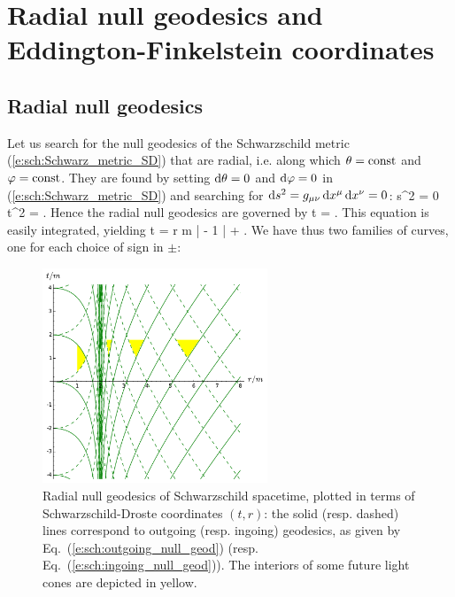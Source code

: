 
\section{Radial null geodesics and Eddington-Finkelstein coordinates}

\subsection{Radial null geodesics}

Let us search for the null geodesics of the Schwarzschild metric
(\ref{e:sch:Schwarz_metric_SD}) that are radial, i.e. along which
$\theta=\mathrm{const}$ and $\varphi=\mathrm{const}$. They are found by
setting  $\mathrm{d}\theta=0$ and $\mathrm{d}\varphi=0$
in (\ref{e:sch:Schwarz_metric_SD})
and searching for $\mathrm{d} s^2 = g_{\mu\nu}\, \mathrm{d} x^\mu \, \mathrm{d} x^\nu = 0$:
\be \label{e:sch:radial_null}
    \D s^2 = 0 \iff \D t^2 =  .
\ee
Hence the radial null geodesics are governed by
\be
    \D t = \pm {} .
\ee
This equation is easily integrated, yielding
\be
    t = \pm r  m \ln \left|  - 1 \right| +  .
\ee
We have thus two families of curves, one for each choice
of sign in $\pm$:

\begin{figure}
\centerline{\includegraphics[width=0.6\textwidth]{sch_rad_null_geod.pdf}}
\caption[]{\label{f:sch:rad_null_geod} \footnotesize
Radial null geodesics of Schwarzschild spacetime, plotted in terms
of Schwarzschild-Droste coordinates $(t,r)$: the solid (resp. dashed) lines
correspond to outgoing (resp. ingoing) geodesics, as given by Eq.~(\ref{e:sch:outgoing_null_geod})
(resp. Eq.~(\ref{e:sch:ingoing_null_geod})). The interiors of some future light
cones are depicted in yellow.}
\end{figure}


